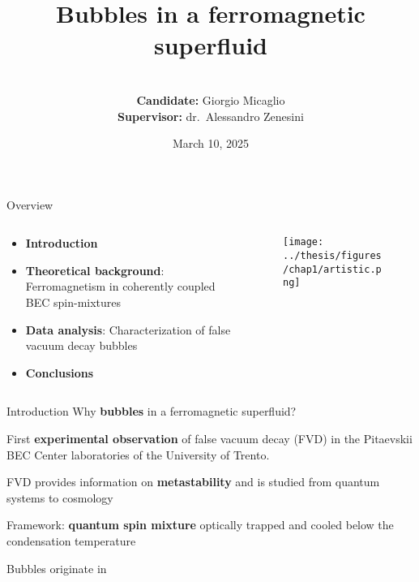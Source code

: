 \documentclass[handout]{beamer}
\title{Bubbles in a ferromagnetic superfluid}
\author{\\\textbf{Candidate:} Giorgio Micaglio\\ \textbf{Supervisor:} dr.\ Alessandro Zenesini }
\date{March 10, 2025}
\institute{\\~\\Bachelor's Degree in Physics}
\begin{document}
\begin{frame}[plain]
    \maketitle
\end{frame}

\begin{frame}{Overview}
    \begin{columns}
        \begin{column}{0.6\textwidth}
            \begin{itemize}
                \item \textbf{Introduction}
                \item \textbf{Theoretical background}: Ferromagnetism in coherently coupled BEC spin-mixtures
                \item \textbf{Data analysis}: Characterization of false vacuum decay bubbles
                \item \textbf{Conclusions}
            \end{itemize}
        \end{column}
        \begin{column}{0.4\textwidth}
            \begin{figure}
                \centering
                \texttt{[image: ../thesis/figures/chap1/artistic.png]}
            \end{figure}
        \end{column}
    \end{columns}
\end{frame}

\begin{frame}{Introduction}
    Why \textbf{bubbles} in a ferromagnetic superfluid?

    First \textbf{experimental observation} of false vacuum decay (FVD) in the Pitaevskii BEC Center laboratories of the University of Trento.

    FVD provides information on \textbf{metastability} and is studied from quantum systems to cosmology

    Framework: \textbf{quantum spin mixture} optically trapped and cooled below the condensation temperature

    Bubbles originate in 
\end{frame}

\end{document}
